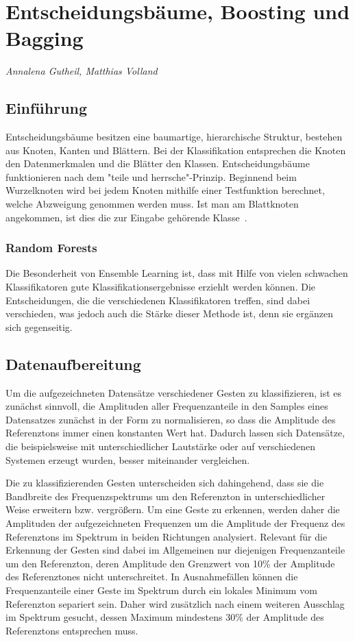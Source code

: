 \section{Entscheidungsbäume, Boosting und Bagging}
\textit{Annalena Gutheil, Matthias Volland}

\subsection{Einführung}
Entscheidungsbäume besitzen eine baumartige, hierarchische Struktur, bestehen aus Knoten, Kanten und Blättern. Bei der Klassifikation entsprechen die Knoten den Datenmerkmalen und die Blätter den Klassen. Entscheidungsbäume funktionieren nach dem "teile und herrsche"-Prinzip. Beginnend beim Wurzelknoten wird bei jedem Knoten mithilfe einer Testfunktion berechnet, welche Abzweigung genommen werden muss. Ist man am Blattknoten angekommen, ist dies die zur Eingabe gehörende Klasse~\cite{alpaydin:maschinelles_lernen, borgelt:data_mining}.

\subsubsection*{Random Forests}

Die Besonderheit von Ensemble Learning ist, dass mit Hilfe von vielen schwachen Klassifikatoren gute Klassifikationsergebnisse erziehlt werden können. Die Entscheidungen, die die verschiedenen Klassifikatoren treffen, sind dabei verschieden, was jedoch auch die Stärke dieser Methode ist, denn sie ergänzen sich gegenseitig.

\subsection{Datenaufbereitung}

Um die aufgezeichneten Datensätze verschiedener Gesten zu klassifizieren, ist es zunächst sinnvoll, die Amplituden aller Frequenzanteile in den Samples eines Datensatzes zunächst in der Form zu normalisieren, so dass die Amplitude des Referenztons immer einen konstanten Wert hat. Dadurch lassen sich Datensätze, die beispielsweise mit unterschiedlicher Lautstärke oder auf verschiedenen Systemen erzeugt wurden, besser miteinander vergleichen.

Die zu klassifizierenden Gesten unterscheiden sich dahingehend, dass sie die Bandbreite des Frequenzspektrums um den Referenzton in unterschiedlicher Weise erweitern bzw. vergrößern. Um eine Geste zu erkennen, werden daher die Amplituden der aufgezeichneten Frequenzen um die Amplitude der Frequenz des Referenztons im Spektrum in beiden Richtungen analysiert. Relevant für die Erkennung der Gesten sind dabei im Allgemeinen nur diejenigen Frequenzanteile um den Referenzton, deren Amplitude den Grenzwert von 10\% der Amplitude des Referenztones nicht unterschreitet. In Ausnahmefällen können die Frequenzanteile einer Geste im Spektrum durch ein lokales Minimum vom Referenzton separiert sein. Daher wird zusätzlich nach einem weiteren Ausschlag im Spektrum gesucht, dessen Maximum mindestens 30\% der Amplitude des Referenztons entsprechen muss.


